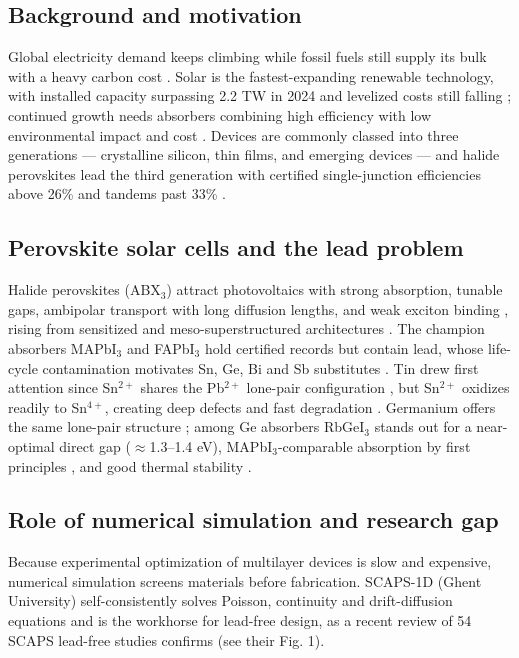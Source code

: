 \documentclass[aip,jap,amsmath,amssymb,preprint]{revtex4-2}
\begin{document}
\subsection{Background and motivation}
Global electricity demand keeps climbing while fossil fuels still supply its bulk with a heavy carbon cost \cite{r1,r2}. Solar is the fastest-expanding renewable technology, with installed capacity surpassing 2.2 TW in 2024 and levelized costs still falling \cite{r3}; continued growth needs absorbers combining high efficiency with low environmental impact and cost \cite{r4}. Devices are commonly classed into three generations --- crystalline silicon, thin films, and emerging devices --- and halide perovskites lead the third generation with certified single-junction efficiencies above 26\% and tandems past 33\% \cite{r3}.

\subsection{Perovskite solar cells and the lead problem}
Halide perovskites (ABX$_{3}$) attract photovoltaics with strong absorption, tunable gaps, ambipolar transport with long diffusion lengths, and weak exciton binding \cite{r7,r8}, rising from sensitized and meso-superstructured architectures \cite{r9,r10}. The champion absorbers MAPbI$_{3}$ and FAPbI$_{3}$ hold certified records \cite{r3,r6} but contain lead, whose life-cycle contamination motivates Sn, Ge, Bi and Sb substitutes \cite{r11,r12}. Tin drew first attention since Sn$^{2+}$ shares the Pb$^{2+}$ lone-pair configuration \cite{r11}, but Sn$^{2+}$ oxidizes readily to Sn$^{4+}$, creating deep defects and fast degradation \cite{r11,r12}. Germanium offers the same lone-pair structure \cite{r13}; among Ge absorbers RbGeI$_{3}$ stands out for a near-optimal direct gap ($\approx$1.3--1.4 eV), MAPbI$_{3}$-comparable absorption by first principles \cite{r13,r17,r18}, and good thermal stability \cite{r14}.

\subsection{Role of numerical simulation and research gap}
Because experimental optimization of multilayer devices is slow and expensive, numerical simulation screens materials before fabrication. SCAPS-1D (Ghent University) self-consistently solves Poisson, continuity and drift-diffusion equations \cite{r19,r20} and is the workhorse for lead-free design, as a recent review of 54 SCAPS lead-free studies confirms \cite{rReview} (see their Fig. 1).
\end{document}
